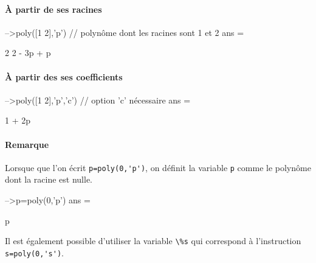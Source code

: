 \paragraph{\`A partir de ses racines}
\begin{Scilabcode}
-->poly([1 2],'p')    // polynôme dont les racines sont 1 et 2
 ans  =
 
              2  
    2 - 3p + p 
\end{Scilabcode}
\paragraph{\`A partir des ses coefficients}
\begin{Scilabcode}
-->poly([1 2],'p','c')    // option 'c' nécessaire
 ans  =
 
    1 + 2p
\end{Scilabcode}
\paragraph{Remarque}
Lorsque que l'on écrit \verb?p=poly(0,'p')?, on définit la variable \verb?p? 
comme le polynôme dont la racine est nulle.
\begin{Scilabcode}
-->p=poly(0,'p')
 ans  =

    p
\end{Scilabcode}
Il est également possible d'utiliser la variable \verb?\%s? qui correspond
à l'instruction \verb?s=poly(0,'s')?.
